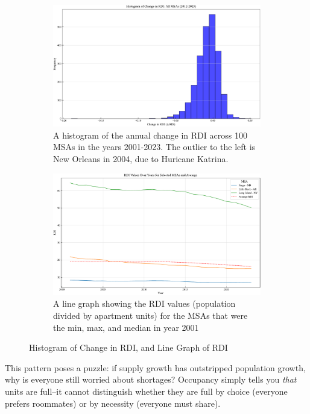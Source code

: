 \documentclass[APA,Times1COL]{WileyNJDv5} %
\begin{document}
\begin{figure}[!htb]
	\centering
	\begin{subfigure}[b]{0.48\textwidth}
		\centering
		\includegraphics[width=\textwidth]{rdi_growth_histogram.pdf}
		\caption{A histogram of the annual change in RDI across 100 MSAs in the years 2001-2023. The outlier to the left is New  Orleans in 2004, due to Huricane Katrina.\label{fig:rdi_hist}}
	\end{subfigure}
	\hfill
	\begin{subfigure}[b]{0.48\textwidth}
		\centering
		\includegraphics[width=\textwidth]{rdi_trends_selected_msas.pdf}
		\caption{A line graph showing the RDI values (population divided by apartment units) for the MSAs that were the min, max, and median in year 2001}
		\label{fig:rdi_lines}
	\end{subfigure}
	\caption{Histogram of Change in RDI, and Line Graph of RDI}
	\label{fig:sidebyside}
\end{figure}
This pattern poses a puzzle: if supply growth has outstripped population growth, why is everyone still worried about shortages? Occupancy simply tells you \textit{that} units are full--it cannot distinguish whether they are full by choice (everyone prefers roommates) or by necessity (everyone must share).
\end{document}
